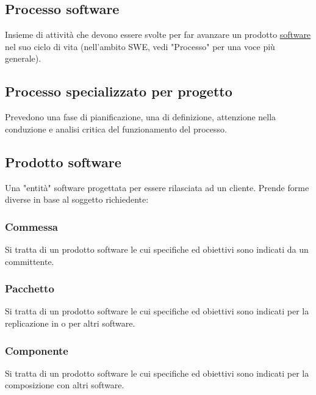 	\subsection{Processo software}
	\label{sec:processisoftware}
	Insieme di attività che devono essere svolte per far avanzare un prodotto \underline{\hyperref[sec:prodottosoftware]{software}} nel suo ciclo di vita (nell'ambito SWE, vedi "Processo" per una voce più generale).

	\subsection{Processo specializzato per progetto}
	\label{sec:processispecializzati}
	Prevedono una fase di pianificazione, una di definizione, attenzione nella conduzione e analisi critica del funzionamento del processo.

	\subsection{Prodotto software}
	\label{sec:prodottosoftware}
	Una "entità" software progettata per essere rilasciata ad un cliente.
	Prende forme diverse in base al soggetto richiedente:

		\subsubsection{Commessa}
		Si tratta di un prodotto software le cui specifiche ed obiettivi sono indicati da un committente.

		\subsubsection{Pacchetto}
		Si tratta di un prodotto software le cui specifiche ed obiettivi sono indicati per la replicazione in o per altri software.

		\subsubsection{Componente}
		Si tratta di un prodotto software le cui specifiche ed obiettivi sono indicati per la composizione con altri software.

